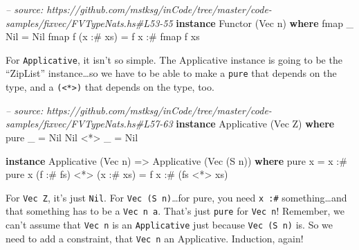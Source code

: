 \documentclass[]{article}
\newenvironment{Shaded}{}{}
\newcommand{\KeywordTok}[1]{\textcolor[rgb]{0.00,0.44,0.13}{\textbf{{#1}}}}
\newcommand{\DataTypeTok}[1]{\textcolor[rgb]{0.56,0.13,0.00}{{#1}}}
\newcommand{\CommentTok}[1]{\textcolor[rgb]{0.38,0.63,0.69}{\textit{{#1}}}}
\newcommand{\OtherTok}[1]{\textcolor[rgb]{0.00,0.44,0.13}{{#1}}}
\newcommand{\FunctionTok}[1]{\textcolor[rgb]{0.02,0.16,0.49}{{#1}}}
\newcommand{\NormalTok}[1]{{#1}}
\begin{document}
\begin{Shaded}
\begin{Highlighting}[]
\CommentTok{-- source: https://github.com/mstksg/inCode/tree/master/code-samples/fixvec/FVTypeNats.hs#L53-55}
\KeywordTok{instance} \DataTypeTok{Functor} \NormalTok{(}\DataTypeTok{Vec} \NormalTok{n) }\KeywordTok{where}
    \NormalTok{fmap _ }\DataTypeTok{Nil}       \FunctionTok{=} \DataTypeTok{Nil}
    \NormalTok{fmap f (x }\FunctionTok{:#} \NormalTok{xs) }\FunctionTok{=} \NormalTok{f x }\FunctionTok{:#} \NormalTok{fmap f xs}
\end{Highlighting}
\end{Shaded}

For \texttt{Applicative}, it isn't so simple. The Applicative instance
is going to be the ``ZipList'' instance\ldots{}so we have to be able to
make a \texttt{pure} that depends on the type, and a
\texttt{(\textless{}*\textgreater{})} that depends on the type, too.

\begin{Shaded}
\begin{Highlighting}[]
\CommentTok{-- source: https://github.com/mstksg/inCode/tree/master/code-samples/fixvec/FVTypeNats.hs#L57-63}
\KeywordTok{instance} \DataTypeTok{Applicative} \NormalTok{(}\DataTypeTok{Vec} \DataTypeTok{Z}\NormalTok{) }\KeywordTok{where}
    \NormalTok{pure _    }\FunctionTok{=} \DataTypeTok{Nil}
    \DataTypeTok{Nil} \FunctionTok{<*>} \NormalTok{_ }\FunctionTok{=} \DataTypeTok{Nil}

\KeywordTok{instance} \DataTypeTok{Applicative} \NormalTok{(}\DataTypeTok{Vec} \NormalTok{n) }\OtherTok{=>} \DataTypeTok{Applicative} \NormalTok{(}\DataTypeTok{Vec} \NormalTok{(}\DataTypeTok{S} \NormalTok{n)) }\KeywordTok{where}
    \NormalTok{pure x }\FunctionTok{=} \NormalTok{x }\FunctionTok{:#} \NormalTok{pure x}
    \NormalTok{(f }\FunctionTok{:#} \NormalTok{fs) }\FunctionTok{<*>} \NormalTok{(x }\FunctionTok{:#} \NormalTok{xs) }\FunctionTok{=} \NormalTok{f x }\FunctionTok{:#} \NormalTok{(fs }\FunctionTok{<*>} \NormalTok{xs)}
\end{Highlighting}
\end{Shaded}

For \texttt{Vec\ Z}, it's just \texttt{Nil}. For
\texttt{Vec\ (S\ n)}\ldots{}for pure, you need \texttt{x\ :\#}
something\ldots{}and that something has to be a \texttt{Vec\ n\ a}.
That's just \texttt{pure} for \texttt{Vec\ n}! Remember, we can't assume
that \texttt{Vec\ n} is an \texttt{Applicative} just because
\texttt{Vec\ (S\ n)} is. So we need to add a constraint, that
\texttt{Vec\ n} an Applicative. Induction, again!
\end{document}
